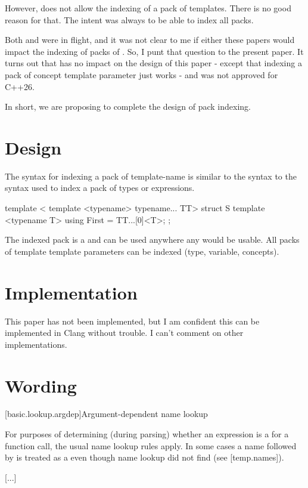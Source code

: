 \documentclass{wg21}
\begin{document}
However,  does not allow the indexing of a pack of templates.
There is no good reason for that. The intent was always to be able to index all packs.

Both  and  were in flight, and it was not clear to me if either
these papers would impact the indexing of packs of .
So, I punt that question to the present paper.
It turns out that  has no impact on the design of this paper - except that indexing a pack of
concept template parameter just works - and  was not approved for C++26.

In short, we are proposing to complete the design of pack indexing.

\section{Design}

The syntax for indexing a pack of template-name is similar to the syntax
to the syntax used to index a pack of types or expressions.

\begin{colorblock}

template < template <typename> typename... TT>
struct S {
    template <typename T>
    using First = TT...[0]<T>;
};
\end{colorblock}

The indexed pack is a  and can be used anywhere any 
would be usable.
All packs of template template parameters can be indexed (type, variable, concepts).

\section{Implementation}

This paper has not been implemented, but I am confident this can be implemented in Clang without trouble.
I can't comment on other implementations.

\section{Wording}

[basic.lookup.argdep]{Argument-dependent name lookup}%

\begin{note}
For purposes of determining
(during parsing) whether an expression is a
 for a function call, the usual name lookup
rules apply.
In some cases
a name followed by \tcode{<} is treated as a 
even though name lookup did not find 
(see [temp.names]).

[...]\\
\end{note}
\end{document}
